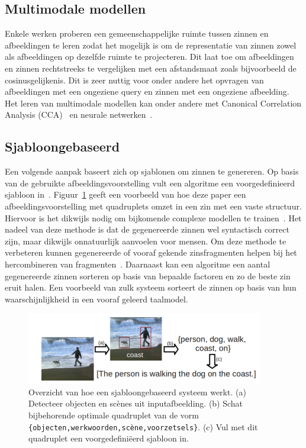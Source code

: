 \subsection{Multimodale modellen}
Enkele werken proberen een gemeenschappelijke ruimte tussen zinnen en afbeeldingen te leren zodat het mogelijk is om de representatie van zinnen zowel als afbeeldingen op dezelfde ruimte te projecteren. Dit laat toe om afbeeldingen en zinnen rechtstreeks te vergelijken met een afstandsmaat zoals bijvoorbeeld de cosinusgelijkenis. Dit is zeer nuttig voor onder andere het opvragen van afbeeldingen met een ongeziene query en zinnen met een ongeziene afbeelding. Het leren van multimodale modellen kan onder andere met Canonical Correlation Analysis (CCA)~\cite{Hodosh2013} en neurale netwerken~\cite{Mao2014,Karpathy2014,Kiros2013}. 

\subsection{Sjabloongebaseerd}
Een volgende aanpak baseert zich op sjablonen om zinnen te genereren. Op basis van de gebruikte afbeeldingsvoorstelling vult een algoritme een voorgedefinieerd sjabloon in~\cite{Yang2011}. Figuur~\ref{fig:sjabloon} geeft een voorbeeld van hoe deze paper een afbeeldingsvoorstelling met quadruplets omzet in een zin met een vaste structuur. Hiervoor is het dikwijls nodig om bijkomende complexe modellen te trainen~\cite{Elliott2013}. Het nadeel van deze methode is dat de gegenereerde zinnen wel syntactisch correct zijn, maar dikwijls onnatuurlijk aanvoelen voor mensen. Om deze methode te verbeteren kunnen gegenereerde of vooraf gekende zinsfragmenten helpen bij het hercombineren van fragmenten~\cite{Mitchell2012,Kuznetsova2012}. Daarnaast kan een algoritme een aantal gegenereerde zinnen sorteren op basis van bepaalde factoren en zo de beste zin eruit halen. Een voorbeeld van zulk systeem sorteert de zinnen op basis van hun waarschijnlijkheid in een vooraf geleerd taalmodel.

 \begin{figure}[tb]
 	\centering
 	\includegraphics[width=\textwidth]{Images/sjabloon.PNG}
 	\caption{Overzicht van hoe een sjabloongebaseerd systeem werkt. (a) Detecteer objecten en sc\`enes uit inputafbeelding. (b) Schat bijbehorende optimale quadruplet van de vorm \texttt{\{objecten,werkwoorden,sc\`ene,voorzetsels\}}. (c) Vul met dit quadruplet een voorgedefini\"eerd sjabloon in.~\cite{Yang2011}}
 	\label{fig:sjabloon}
 \end{figure}

